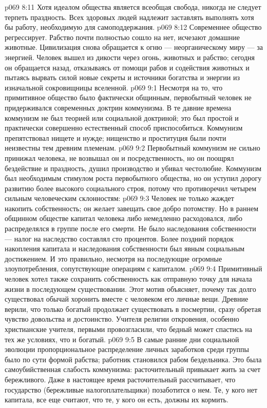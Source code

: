 \vs p069 8:11 Хотя идеалом общества является всеобщая свобода, никогда не следует терпеть праздность. Всех здоровых людей надлежит заставлять выполнять хотя бы работу, необходимую для самоподдержания.
\vs p069 8:12 Современнее общество регрессирует. Рабство почти полностью сошло на нет, исчезают домашние животные. Цивилизация снова обращается к огню --- неорганическому миру --- за энергией. Человек вышел из дикости через огонь, животных и рабство; сегодня он обращается назад, отказываясь от помощи рабов и содействия животных и пытаясь вырвать силой новые секреты и источники богатства и энергии из изначальной сокровищницы вселенной.
\vs p069 9:1 Несмотря на то, что примитивное общество было фактически общинным, первобытный человек не придерживался современных доктрин коммунизма. В те давние времена коммунизм не был теорией или социальной доктриной; это был простой и практически совершенно естественный способ приспособиться. Коммунизм препятствовал нищете и нужде; нищенство и проституция были почти неизвестны тем древним племенам.
\vs p069 9:2 \pc Первобытный коммунизм не сильно принижал человека, не возвышал он и посредственность, но он поощрял бездействие и праздность, душил производство и убивал честолюбие. Коммунизм был необходимым стимулом роста первобытного общества, но он уступил дорогу развитию более высокого социального строя, потому что противоречил четырем сильным человеческим склонностям:
\vs p069 9:3 \bibnobreakspace {} Человек не только жаждет накопить собственность; он желает завещать свое добро потомству. Но в раннем общинном обществе капитал человека либо немедленно расходовался, либо распределялся в группе после его смерти. Не было наследования собственности --- налог на наследство составлял сто процентов. Более поздний порядок накопления капитала и наследования собственности был явным социальным достижением. И это правильно, несмотря на последующие огромные злоупотребления, сопутствующие операциям с капиталом.
\vs p069 9:4 \pc {}\bibnobreakspace {} Примитивный человек хотел также сохранить собственность как отправную точку для начала жизни в последующем существовании. Этот мотив объясняет, почему так долго существовал обычай хоронить вместе с человеком его личные вещи. Древние верили, что только богатый продолжает существовать в посмертии, сразу обретая чувство довольства и достоинство. Учителя религии откровения, особенно христианские учителя, первыми провозгласили, что бедный может спастись на тех же условиях, что и богатый.
\vs p069 9:5 \pc {}\bibnobreakspace {} В самые ранние дни социальной эволюции пропорциональное распределение личных заработков среди группы было по сути формой рабства; работник становился рабом бездельника. Это была самоубийственная слабость коммунизма: расточительный привыкает жить за счет бережливого. Даже в настоящее время расточительный рассчитывает, что государство (бережливые налогоплательщики) позаботится о нем. Те, у кого нет капитала, все еще считают, что те, у кого он есть, должны их кормить.
